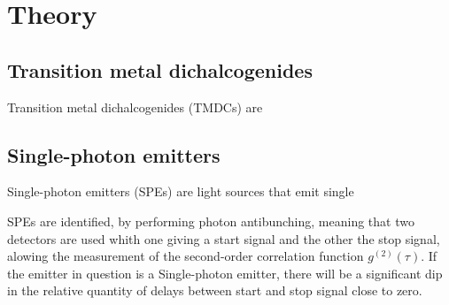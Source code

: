 \section{Theory}
\label{sec:theory}

\subsection{Transition metal dichalcogenides}

Transition metal dichalcogenides (TMDCs) are %

\subsection{Single-photon emitters}

Single-photon emitters (SPEs) are light sources that emit single

SPEs are identified, by performing photon antibunching, meaning that two detectors are used whith one giving a start signal and the other the stop signal, alowing the measurement of the second-order correlation function $g^{(2)}(\tau)$.
If the emitter in question is a Single-photon emitter, there will be a significant dip in the relative quantity of delays between start and stop signal close to zero.
